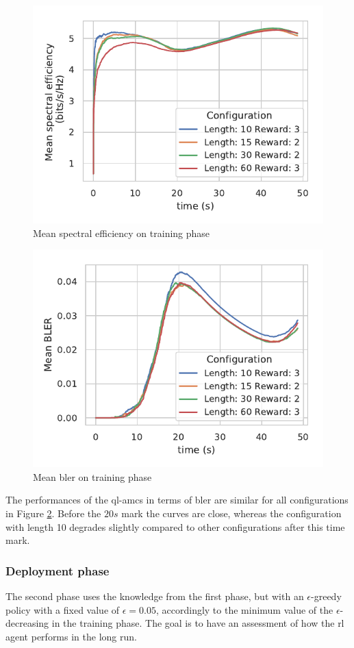 \begin{figure}[!htbp]
\centerline{\includegraphics[width=0.7\columnwidth]{figures/chp_amc/Spec-Eff-Train.pdf}}
\caption{Mean spectral efficiency on training phase}
\label{fig:amc-train-spceff}
\end{figure}

\begin{figure}[!htbp]
\centerline{\includegraphics[width=0.7\columnwidth]{figures/chp_amc/BLER-Train.pdf}}
\caption{Mean \gls{bler} on training phase}
\label{fig:amc-train-bler}
\end{figure}

The performances of the \gls{ql-amc}s in terms of \gls{bler} are similar for all configurations in Figure \ref{fig:amc-train-bler}.
%
Before the $20s$ mark the curves are close, whereas the configuration with length 10 degrades slightly compared to other configurations after this time mark.


\subsubsection{Deployment phase}
The second phase uses the knowledge from the first phase, but with an $\epsilon$-greedy policy with a fixed value of $\epsilon = 0.05$, accordingly to the minimum value of the $\epsilon$-decreasing in the training phase.
%
The goal is to have an assessment of how the \gls{rl} agent performs in the long run.
%


